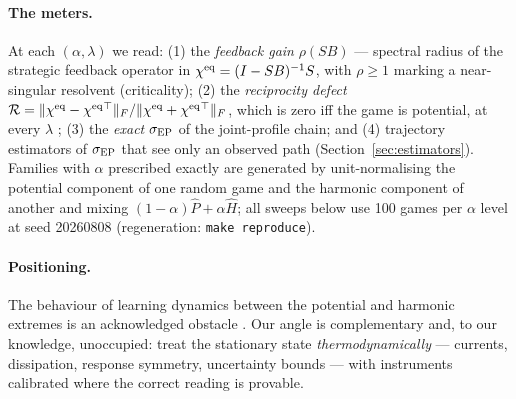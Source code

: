 \paragraph{The meters.} At each $(\alpha, \lambda)$ we read:
(1) the \emph{feedback gain} $\rho(SB)$ --- spectral radius of the strategic
feedback operator in $\chi^{\mathrm{eq}} = (I-SB)^{-1}S$, with $\rho \ge 1$ marking a
near-singular resolvent (criticality);
(2) the \emph{reciprocity defect}
$\mathcal{R} = \lVert \chi^{\mathrm{eq}} - \chi^{\mathrm{eq}}{}^{\top}\rVert_F / \lVert \chi^{\mathrm{eq}} + \chi^{\mathrm{eq}}{}^{\top}\rVert_F$,
which is zero iff the game is potential, at every $\lambda$ \citep{p1};
(3) the \emph{exact} $\sigma_{\mathrm{EP}}$ of the joint-profile chain; and
(4) trajectory estimators of $\sigma_{\mathrm{EP}}$ that see only an observed path
(Section~\ref{sec:estimators}).
Families with $\alpha$ prescribed exactly are generated by unit-normalising
the potential component of one random game and the harmonic component of
another and mixing $(1-\alpha)\hat P + \alpha \hat H$; all sweeps below use
100 games per $\alpha$ level at seed 20260808 (regeneration:
\texttt{make reproduce}).

\paragraph{Positioning.} The behaviour of learning dynamics between the
potential and harmonic extremes is an acknowledged obstacle
\citep{legacci2024}. Our angle is complementary and, to our knowledge,
unoccupied: treat the stationary state \emph{thermodynamically} --- currents,
dissipation, response symmetry, uncertainty bounds --- with instruments
calibrated where the correct reading is provable.
